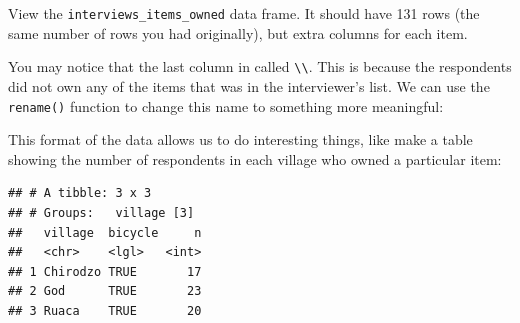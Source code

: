 \documentclass[]{book}
\newenvironment{Shaded}{\begin{snugshade}}{\end{snugshade}}
\newcommand{\KeywordTok}[1]{\textcolor[rgb]{0.13,0.29,0.53}{\textbf{#1}}}
\newcommand{\DataTypeTok}[1]{\textcolor[rgb]{0.13,0.29,0.53}{#1}}
\newcommand{\StringTok}[1]{\textcolor[rgb]{0.31,0.60,0.02}{#1}}
\newcommand{\OtherTok}[1]{\textcolor[rgb]{0.56,0.35,0.01}{#1}}
\newcommand{\OperatorTok}[1]{\textcolor[rgb]{0.81,0.36,0.00}{\textbf{#1}}}
\newcommand{\NormalTok}[1]{#1}
\begin{document}
\begin{Shaded}
\end{Shaded}

View the \texttt{interviews\_items\_owned} data frame. It should have
131 rows (the same number of rows you had originally), but extra columns
for each item.

You may notice that the last column in called
\texttt{\textbackslash{}}\texttt{\textbackslash{}}. This is because the
respondents did not own any of the items that was in the interviewer's
list. We can use the \texttt{rename()} function to change this name to
something more meaningful:

\begin{Shaded}
\end{Shaded}

This format of the data allows us to do interesting things, like make a
table showing the number of respondents in each village who owned a
particular item:

\begin{Shaded}
\end{Shaded}

\begin{verbatim}
## # A tibble: 3 x 3
## # Groups:   village [3]
##   village  bicycle     n
##   <chr>    <lgl>   <int>
## 1 Chirodzo TRUE       17
## 2 God      TRUE       23
## 3 Ruaca    TRUE       20
\end{verbatim}
\end{document}
